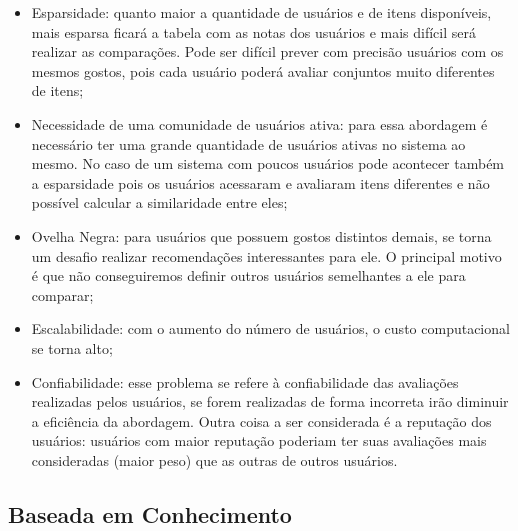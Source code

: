 \begin{itemize}
\item Esparsidade: quanto maior a quantidade de usuários e de itens disponíveis, mais esparsa ficará a tabela com as notas dos usuários e mais difícil será realizar as comparações. Pode ser difícil prever com precisão usuários com os mesmos gostos, pois cada usuário poderá avaliar conjuntos muito diferentes de itens;
\item Necessidade de uma comunidade de usuários ativa: para essa abordagem é necessário ter uma grande quantidade de usuários ativas no sistema ao mesmo. No caso de um sistema com poucos usuários pode acontecer também a esparsidade pois os usuários acessaram e avaliaram itens diferentes e  não possível calcular a similaridade entre eles;
\item Ovelha Negra: para usuários que possuem gostos distintos demais, se torna um desafio realizar recomendações interessantes para ele. O principal motivo é que não conseguiremos definir outros usuários semelhantes a ele para comparar;
\item Escalabilidade: com o aumento do número de usuários, o custo computacional se torna alto;
\item Confiabilidade: esse problema se refere à confiabilidade das avaliações realizadas pelos usuários, se forem realizadas de forma incorreta irão diminuir a eficiência da abordagem. Outra coisa a ser considerada é a reputação dos usuários: usuários com maior reputação poderiam ter suas avaliações mais consideradas (maior peso) que as outras de outros usuários.
\end{itemize}

\subsection{Baseada em Conhecimento}

